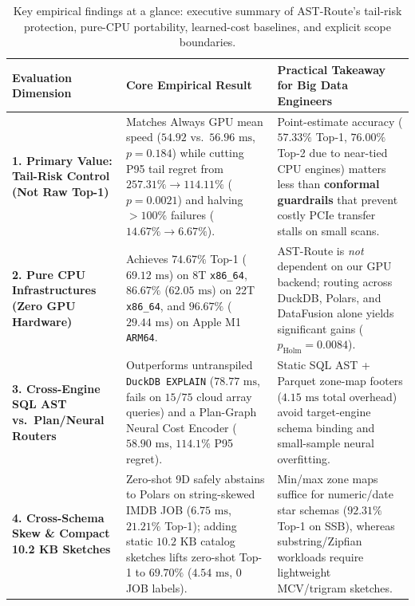 \documentclass[10pt,a4paper]{article}
\newenvironment{fitasttable}{%
  \begin{lrbox}{\asttblbox}%
}{%
  \end{lrbox}%
  \sbox{\asttblboxB}{%
    \ifdim\wd\asttblbox>0.96\textwidth
      \resizebox{0.96\textwidth}{!}{\usebox{\asttblbox}}%
    \else
      \usebox{\asttblbox}%
    \fi
  }%
  \ifdim\ht\asttblboxB>0.72\textheight
    \resizebox{!}{0.72\textheight}{\usebox{\asttblboxB}}%
  \else
    \usebox{\asttblboxB}%
  \fi
}
\begin{document}
\begin{table}[!htbp]
{\centering
\caption{Key empirical findings at a glance: executive summary of AST-Route's tail-risk protection, pure-CPU portability, learned-cost baselines, and explicit scope boundaries.}\label{tab:key_findings_glance}\label{tab:jbd_glance_1a}
\setlength{\tabcolsep}{4.0pt}
\scriptsize
\begin{fitasttable}
\begin{tabular}{@{}p{2.9cm}p{5.3cm}p{6.8cm}@{}}
\toprule
\textbf{Evaluation Dimension} & \textbf{Core Empirical Result} & \textbf{Practical Takeaway for Big Data Engineers} \\
\midrule
\textbf{1. Primary Value: Tail-Risk Control (Not Raw Top-1)} & Matches Always GPU mean speed ($54.92$ vs.\ $56.96\text{ ms}$, $p=0.184$) while cutting P95 tail regret from $\mathbf{257.31\% \rightarrow 114.11\%}$ ($p=0.0021$) and halving $>100\%$ failures ($14.67\%\rightarrow 6.67\%$). & Point-estimate accuracy ($57.33\%$ Top-1, $76.00\%$ Top-2 due to near-tied CPU engines) matters less than \textbf{conformal guardrails} that prevent costly PCIe transfer stalls on small scans. \\
\textbf{2. Pure CPU Infrastructures (Zero GPU Hardware)} & Achieves $74.67\%$ Top-1 ($69.12\text{ ms}$) on 8T \texttt{x86\_64}, $86.67\%$ ($62.05\text{ ms}$) on 22T \texttt{x86\_64}, and $96.67\%$ ($29.44\text{ ms}$) on Apple M1 \texttt{ARM64}. & AST-Route is \emph{not} dependent on our GPU backend; routing across DuckDB, Polars, and DataFusion alone yields significant gains ($p_{\text{Holm}}=0.0084$). \\
\textbf{3. Cross-Engine SQL AST vs.\ Plan/Neural Routers} & Outperforms untranspiled \texttt{DuckDB EXPLAIN} ($78.77\text{ ms}$, fails on $15/75$ cloud array queries) and a Plan-Graph Neural Cost Encoder ($58.90\text{ ms}$, $114.1\%$ P95 regret). & Static SQL AST + Parquet zone-map footers ($4.15\text{ ms}$ total overhead) avoid target-engine schema binding and small-sample neural overfitting. \\
\textbf{4. Cross-Schema Skew \& Compact 10.2 KB Sketches} & Zero-shot 9D safely abstains to Polars on string-skewed IMDB JOB ($6.75\text{ ms}$, $21.21\%$ Top-1); adding static $10.2\text{ KB}$ catalog sketches lifts zero-shot Top-1 to $\mathbf{69.70\%}$ ($4.54\text{ ms}$, $0$ JOB labels). & Min/max zone maps suffice for numeric/date star schemas ($92.31\%$ Top-1 on SSB), whereas substring/Zipfian workloads require lightweight MCV/trigram sketches. \\

\end{tabular}
\end{fitasttable}}
\end{table}
\end{document}
